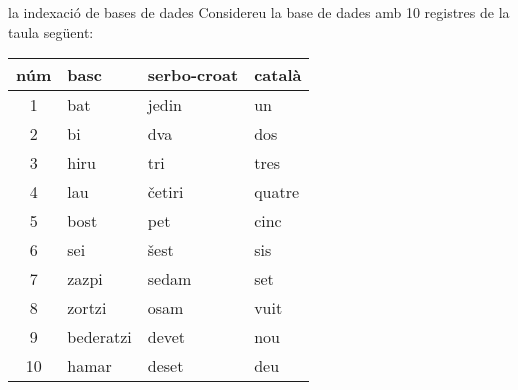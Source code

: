 \begin{persabermes}{la indexació de bases de dades}
  Considereu la base de dades amb 10 registres de la taula
següent:
 \begin{center}
 \begin{tabular}{clll}
 \hline
 {\sc núm} & {\sc basc} & {\sc serbo-croat} & {\sc català} \\
 \hline 
 \hline
  1 & bat  &     jedin &       un \\
  2 & bi   &     dva   &       dos \\
  3 & hiru &     tri   &       tres \\
  4 & lau  &     \v{c}etiri &      quatre \\
  5 & bost &     pet    &      cinc \\
  6 & sei  &     \v{s}est   &      sis \\
  7 & zazpi &    sedam  &      set \\
  8 & zortzi &   osam   &      vuit \\
  9 & bederatzi & devet &       nou \\
 10 & hamar &    deset  &      deu \\
 \hline
 \end{tabular}
 \end{center}


\end{persabermes}
